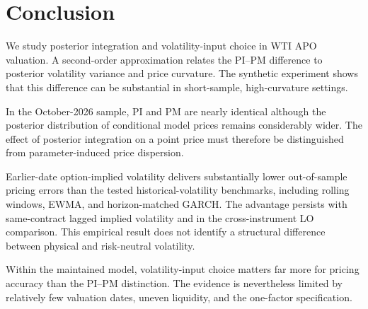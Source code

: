 \section{Conclusion}\label{sec:conclusion}

We study posterior integration and volatility-input choice in WTI APO valuation. A second-order approximation relates the PI--PM difference to posterior volatility variance and price curvature. The synthetic experiment shows that this difference can be substantial in short-sample, high-curvature settings.

In the October-2026 sample, PI and PM are nearly identical although the posterior distribution of conditional model prices remains considerably wider. The effect of posterior integration on a point price must therefore be distinguished from parameter-induced price dispersion.

Earlier-date option-implied volatility delivers substantially lower out-of-sample pricing errors than the tested historical-volatility benchmarks, including rolling windows, EWMA, and horizon-matched GARCH. The advantage persists with same-contract lagged implied volatility and in the cross-instrument LO comparison. This empirical result does not identify a structural difference between physical and risk-neutral volatility.

Within the maintained model, volatility-input choice matters far more for pricing accuracy than the PI--PM distinction. The evidence is nevertheless limited by relatively few valuation dates, uneven liquidity, and the one-factor specification.
